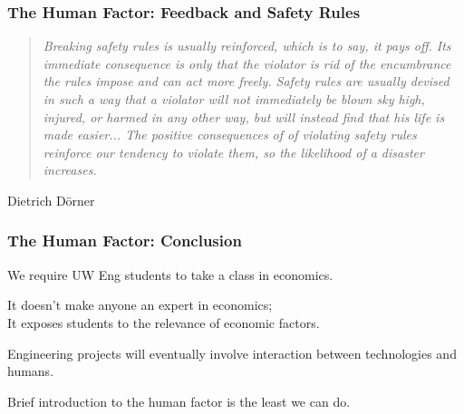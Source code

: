 \begin{frame}
\frametitle{The Human Factor: Feedback and Safety Rules}
\begin{changemargin}{1cm}
\begin{quote}
\textit{Breaking safety rules is usually reinforced, which is to say, it pays off. Its immediate consequence is only that the violator is rid of the encumbrance the rules impose and can act more freely. Safety rules are usually devised in such a way that a violator will not immediately be blown sky high, injured, or harmed in any other way, but will instead find that his life is made easier... The positive consequences of of violating safety rules reinforce our tendency to violate them, so the likelihood of a disaster increases.}
\end{quote}
\hfill Dietrich D\"orner


\end{changemargin}
\end{frame}


\begin{frame}
\frametitle{The Human Factor: Conclusion}
\begin{changemargin}{1cm}

We require UW Eng students to take a class in economics.

It doesn't make anyone an expert in economics;\\
\quad It exposes students to the relevance of economic factors.

Engineering projects will eventually involve interaction between technologies and humans.

Brief introduction to the human factor is the least we can do.

\end{changemargin}
\end{frame}


